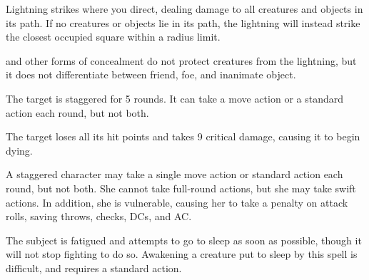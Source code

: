 \spellrng{\rngext}
\begin{spelleffect}
  Lightning strikes where you direct, dealing damage to all creatures and objects in its path. If no creatures or objects lie in its path, the lightning will instead strike the closest occupied square within a \areamed radius limit.
\end{spelleffect}
\begin{spellnotes}
  and other forms of concealment do not protect creatures from the lightning, but it does not differentiate between friend, foe, and inanimate object.
\end{spellnotes}

\begin{spellhealthy}
  The target is staggered for 5 rounds. It can take a move action or a standard action each round, but not both.
\end{spellhealthy}
\begin{spellblood}
  The target loses all its hit points and takes 9 critical damage, causing it to begin dying.
\end{spellblood}
\begin{spellnotes}
 A staggered character may take a single move action or standard action each round, but not both. She cannot take full-round actions, but she may take swift actions. In addition, she is vulnerable, causing her to take a  penalty on attack rolls, saving throws, checks, DCs, and AC.
\end{spellnotes}

\spellrng{\rngmed}
\spelldur{\durshort}
\begin{spelleffect}
  The subject is fatigued and attempts to go to sleep as soon as possible, though it will not stop fighting to do so. Awakening a creature put to sleep by this spell is difficult, and requires a standard action.
\end{spelleffect}

